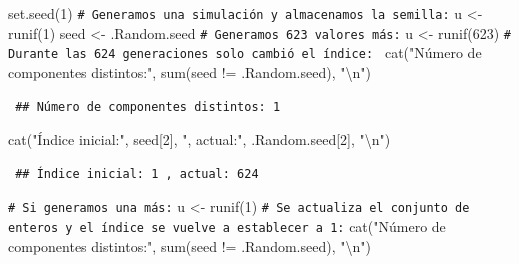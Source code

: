 \documentclass[
  10pt,
]{book}
\newenvironment{Shaded}{\begin{snugshade}}{\end{snugshade}}
\newcommand{\CommentTok}[1]{\textcolor[rgb]{0.56,0.35,0.01}{\textit{#1}}}
\newcommand{\DecValTok}[1]{\textcolor[rgb]{0.00,0.00,0.81}{#1}}
\newcommand{\FunctionTok}[1]{\textcolor[rgb]{0.00,0.00,0.00}{#1}}
\newcommand{\NormalTok}[1]{#1}
\newcommand{\OtherTok}[1]{\textcolor[rgb]{0.56,0.35,0.01}{#1}}
\newcommand{\SpecialCharTok}[1]{\textcolor[rgb]{0.00,0.00,0.00}{#1}}
\newcommand{\StringTok}[1]{\textcolor[rgb]{0.31,0.60,0.02}{#1}}
\theoremstyle{break}
\theoremstyle{nonumberplain}
\renewcommand{\CommentTok}[1]{\textcolor[rgb]{0.41,0.41,0.41}{\texttt{#1}}}
\begin{document}
\begin{Shaded}
\begin{Highlighting}[]
\FunctionTok{set.seed}\NormalTok{(}\DecValTok{1}\NormalTok{)}
\CommentTok{\# Generamos una simulación y almacenamos la semilla:}
\NormalTok{u }\OtherTok{\textless{}{-}} \FunctionTok{runif}\NormalTok{(}\DecValTok{1}\NormalTok{)}
\NormalTok{seed }\OtherTok{\textless{}{-}}\NormalTok{ .Random.seed}
\CommentTok{\# Generamos 623 valores más:}
\NormalTok{u }\OtherTok{\textless{}{-}} \FunctionTok{runif}\NormalTok{(}\DecValTok{623}\NormalTok{)}
\CommentTok{\# Durante las 624 generaciones solo cambió el índice: }
\FunctionTok{cat}\NormalTok{(}\StringTok{"Número de componentes distintos:"}\NormalTok{, }\FunctionTok{sum}\NormalTok{(seed }\SpecialCharTok{!=}\NormalTok{ .Random.seed), }\StringTok{"}\SpecialCharTok{\textbackslash{}n}\StringTok{"}\NormalTok{)}
\end{Highlighting}
\end{Shaded}

\begin{verbatim}
 ## Número de componentes distintos: 1
\end{verbatim}

\begin{Shaded}
\begin{Highlighting}[]
\FunctionTok{cat}\NormalTok{(}\StringTok{"Índice inicial:"}\NormalTok{, seed[}\DecValTok{2}\NormalTok{], }\StringTok{", actual:"}\NormalTok{, .Random.seed[}\DecValTok{2}\NormalTok{], }\StringTok{"}\SpecialCharTok{\textbackslash{}n}\StringTok{"}\NormalTok{)}
\end{Highlighting}
\end{Shaded}

\begin{verbatim}
 ## Índice inicial: 1 , actual: 624
\end{verbatim}

\begin{Shaded}
\begin{Highlighting}[]
\CommentTok{\# Si generamos una más:}
\NormalTok{u }\OtherTok{\textless{}{-}} \FunctionTok{runif}\NormalTok{(}\DecValTok{1}\NormalTok{)}
\CommentTok{\# Se actualiza el conjunto de enteros y el índice se vuelve a establecer a 1:}
\FunctionTok{cat}\NormalTok{(}\StringTok{"Número de componentes distintos:"}\NormalTok{, }\FunctionTok{sum}\NormalTok{(seed }\SpecialCharTok{!=}\NormalTok{ .Random.seed), }\StringTok{"}\SpecialCharTok{\textbackslash{}n}\StringTok{"}\NormalTok{)}
\end{Highlighting}
\end{Shaded}
\end{document}
